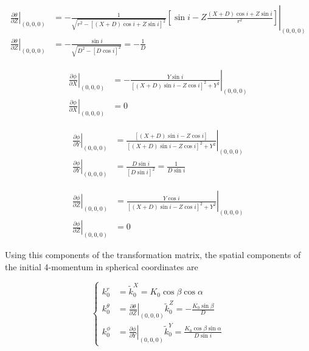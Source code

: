 \footnotesize
\begin{align}
\left. \frac{\partial \theta}{\partial Z} \right|_{(0,0,0)} &= \left.-\frac{1}{\sqrt{r^2-[(X+D)\cos i + Z \sin i]^2}}  \left[ \sin i -  Z \frac{(X+D) \cos i + Z \sin i}{r^2}\right]\right|_{(0,0,0)} \nonumber \\
\left. \frac{\partial \theta}{\partial Z} \right|_{(0,0,0)} &= -\frac{\sin i}{\sqrt{D^2 -[D\cos i ]^2}} = - \frac{1}{D}
\end{align}
\normalsize

\begin{align}
\left. \frac{\partial \phi}{\partial X} \right|_{(0,0,0)} &= \left.-\frac{Y \sin i}{[(X+D)\sin i - Z \cos i ]^2 + Y^2 } \right|_{(0,0,0)} \nonumber \\
\left. \frac{\partial \phi}{\partial X} \right|_{(0,0,0)} &= 0  
\end{align}

\begin{align}
\left. \frac{\partial \phi}{\partial Y} \right|_{(0,0,0)} &= \left.\frac{[(X+D)\sin i - Z \cos i ]}{[(X+D)\sin i - Z \cos i ]^2 + Y^2 } \right|_{(0,0,0)} \nonumber \\
\left. \frac{\partial \phi}{\partial Y} \right|_{(0,0,0)} &= \frac{D \sin i  }{[D \sin i ]^2 }  = \frac{1}{ D \sin i  }
\end{align}

\begin{align}
\left. \frac{\partial \phi}{\partial Z} \right|_{(0,0,0)} &= \left.\frac{Y \cos i}{[(X+D)\sin i - Z \cos i ]^2 + Y^2 } \right|_{(0,0,0)} \nonumber \\
\left. \frac{\partial \phi}{\partial Z} \right|_{(0,0,0)} &= 0  
\end{align}

Using this components of the transformation matrix, the spatial components of the initial 4-momentum in spherical coordinates are

\begin{equation}
\begin{cases}
k^r_0 &= \tilde{k}^X_0 = K_0 \cos \beta \cos \alpha  \\
k^\theta _0 &= \left. \frac{\partial \theta}{\partial Z} \right|_{(0,0,0)}  \tilde{k}^Z_0 = - \frac{K_0 \sin \beta}{D} \\
k^\phi _0 &= \left. \frac{\partial \phi}{\partial Y} \right|_{(0,0,0)}  \tilde{k}^Y_0 = \frac{K_0 \cos \beta \sin \alpha}{ D \sin i  }
\end{cases} \label{initialSpatialMomentum2}
\end{equation}

